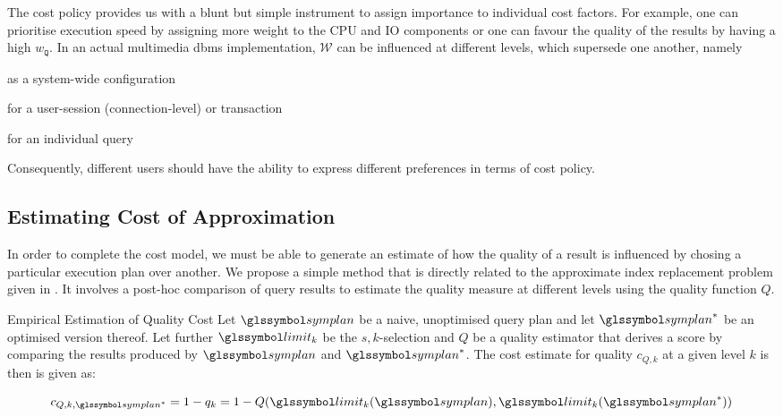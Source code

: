 The cost policy provides us with a blunt but simple instrument to assign importance to individual cost factors. For example, one can prioritise execution speed by assigning more weight to the CPU and IO components or one can favour the quality of the results by having a high $w_{\mathtt{Q}}$. In an actual multimedia \acrshort{dbms} implementation, $\mathcal{W}$ can be influenced at different levels, which supersede one another, namely 
\begin{enumerate*}[label=(\roman*), itemjoin={{, }}, itemjoin*={{, or }}, after={{.}}]
    \item as a system-wide configuration
    \item for a user-session (connection-level) or transaction
    \item for an individual query
\end{enumerate*} 
Consequently, different users should have the ability to express different preferences in terms of cost policy.

\subsection{Estimating Cost of Approximation}
\label{section:quality_cost_estimation}

In order to complete the cost model, we must be able to generate an estimate of how the quality of a result is influenced by chosing a particular execution plan over another. We propose a simple method that is directly related to the approximate index replacement problem given in . It involves a post-hoc comparison of query results to estimate the quality measure at different levels using the quality function $Q$.

\begin{definition}[label=definition:cost_estimation_quality]{Empirical Estimation of Quality Cost}{}
    Let $\symplan$ be a naive, unoptimised query plan and let $\symplan^{*}$ be an optimised version thereof. Let further $\limit_k$ be the $s,k$-selection and $Q$ be a quality estimator that derives a score by comparing the results produced by $\symplan$ and $\symplan^{*}$. The cost estimate for quality $c_{Q,k}$ at a given level $k$ is then is given as:
    
    \begin{equation*}
        c_{Q,k,\symplan^{*}} = 1 - q_k = 1 - Q(\limit_k(\symplan),\limit_k(\symplan^{*}))
    \end{equation*}
\end{definition}

